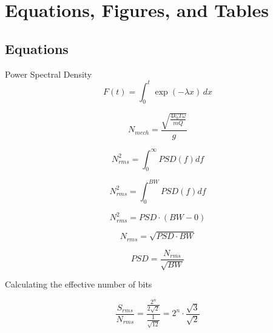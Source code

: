 \chapter[Equations, etc]{Equations, Figures, and Tables}

\section{Equations}
Power Spectral Density
\begin{equation}
F(t)=\int_0^t \exp(-\lambda x)\,dx
\label{eq1}
\end{equation}

\begin{equation}
N_{mech}=\frac{\sqrt{\frac{4 k_b T \omega}{m Q}}}{g}
\label{eq1}
\end{equation}


\begin{equation}
N^{2}_{rms}=\int_0^\infty{PSD(f)df}
\label{eq2}
\end{equation}

\begin{equation}
N^{2}_{rms}=\int_0^{BW}{PSD(f)df}
\label{eq3}
\end{equation}

\begin{equation}
N^{2}_{rms}=PSD \cdot (BW - 0)
\label{eq4}
\end{equation}

\begin{equation}
N_{rms}=\sqrt{PSD \cdot BW}
\label{eq5}
\end{equation}

\begin{equation}
PSD = \frac{N_{rms}}{\sqrt{BW}}
\label{eq6}
\end{equation}

Calculating the effective number of bits

\begin{equation}
\frac{S_{rms}}{N_{rms}} = \frac{\frac{2^n}{2\sqrt{2}}}{\frac{1}{\sqrt{12}}} = 2^n \cdot \frac{\sqrt{3}}{\sqrt{2}}
\label{eq7}
\end{equation}

